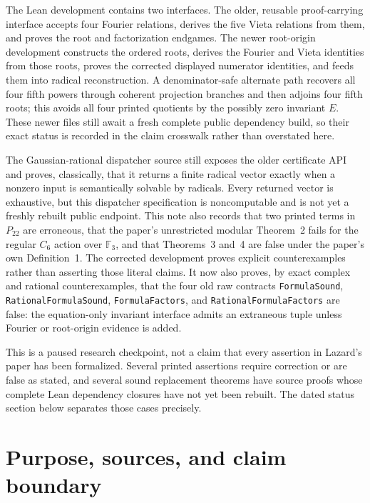 \documentclass[11pt,a4paper,oneside]{article}
\newcommand{\lean}[1]{\nolinkurl{#1}}
\begin{document}
The Lean development contains two interfaces.  The older, reusable
proof-carrying interface accepts four Fourier relations, derives the five
Vieta relations from them, and proves the root and factorization endgames.
The newer root-origin development
constructs the ordered roots, derives the Fourier and Vieta identities from
those roots, proves the corrected displayed numerator identities, and feeds
them into radical reconstruction.  A denominator-safe alternate path recovers
all four fifth powers through coherent projection branches and then adjoins
four fifth roots; this avoids all four printed quotients by the possibly zero
invariant $E$.  These newer files still await a fresh complete public
dependency build, so their exact status is recorded in the claim
crosswalk rather than overstated here.

The Gaussian-rational dispatcher source still exposes the older certificate
API and proves, classically, that it returns a finite radical vector exactly when a
nonzero input is semantically solvable by radicals.  Every returned vector is
exhaustive, but this dispatcher specification is noncomputable and is not yet
a freshly rebuilt public endpoint.  This note also records that two printed
terms in $P_{22}$ are erroneous, that the paper's unrestricted modular
Theorem~2 fails for the regular $C_6$ action over $\mathbb F_3$, and that
Theorems~3 and~4 are false under the paper's own Definition~1.  The corrected
development proves explicit counterexamples rather than asserting those
literal claims.  It now also proves, by exact complex and rational
counterexamples, that the four old raw contracts \lean{FormulaSound},
\lean{RationalFormulaSound}, \lean{FormulaFactors}, and
\lean{RationalFormulaFactors} are false: the equation-only invariant interface
admits an extraneous tuple unless Fourier or root-origin evidence is added.

This is a paused research checkpoint, not a claim that every assertion in
Lazard's paper has been formalized.  Several printed assertions require
correction or are false as stated, and several sound replacement theorems have
source proofs whose complete Lean dependency closures have not yet been
rebuilt.  The dated status section below separates those cases precisely.

\clearpage
\tableofcontents
\clearpage
{}

\section{Purpose, sources, and claim boundary}
\end{document}
